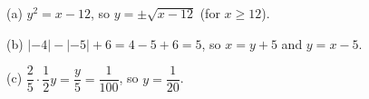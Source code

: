(a) $y^2=x-12$, so $\boxed{y=\pm\sqrt{x-12}}$ (for $x\ge12$).

(b) $|-4|-|-5|+6=4-5+6=5$, so $x=y+5$ and $\boxed{y=x-5}$.

(c) $\dfrac{2}{5}\cdot\dfrac{1}{2}y=\dfrac {y}{5}=\dfrac{1}{100}$, so $\boxed{y=\dfrac{1}{20}}$.
